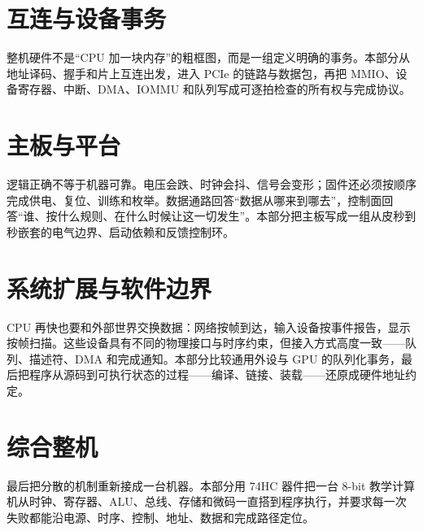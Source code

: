 \documentclass[UTF8,openany,zihao=5,fontset=none]{ctexbook}
\begin{document}
\part{互连与设备事务}
\begin{partbridge}
整机硬件不是“CPU 加一块内存”的粗框图，而是一组定义明确的事务。本部分从地址译码、握手和片上互连出发，进入 PCIe 的链路与数据包，再把 MMIO、设备寄存器、中断、DMA、IOMMU 和队列写成可逐拍检查的所有权与完成协议。
\end{partbridge}




\part{主板与平台}
\begin{partbridge}
逻辑正确不等于机器可靠。电压会跌、时钟会抖、信号会变形；固件还必须按顺序完成供电、复位、训练和枚举。数据通路回答“数据从哪来到哪去”，控制面回答“谁、按什么规则、在什么时候让这一切发生”。本部分把主板写成一组从皮秒到秒嵌套的电气边界、启动依赖和反馈控制环。
\end{partbridge}




\part{系统扩展与软件边界}
\begin{partbridge}
CPU 再快也要和外部世界交换数据：网络按帧到达，输入设备按事件报告，显示按帧扫描。这些设备具有不同的物理接口与时序约束，但接入方式高度一致——队列、描述符、DMA 和完成通知。本部分比较通用外设与 GPU 的队列化事务，最后把程序从源码到可执行状态的过程——编译、链接、装载——还原成硬件地址约定。
\end{partbridge}




\part{综合整机}
\begin{partbridge}
最后把分散的机制重新接成一台机器。本部分用 74HC 器件把一台 8-bit 教学计算机从时钟、寄存器、ALU、总线、存储和微码一直搭到程序执行，并要求每一次失败都能沿电源、时序、控制、地址、数据和完成路径定位。
\end{partbridge}




\end{document}

